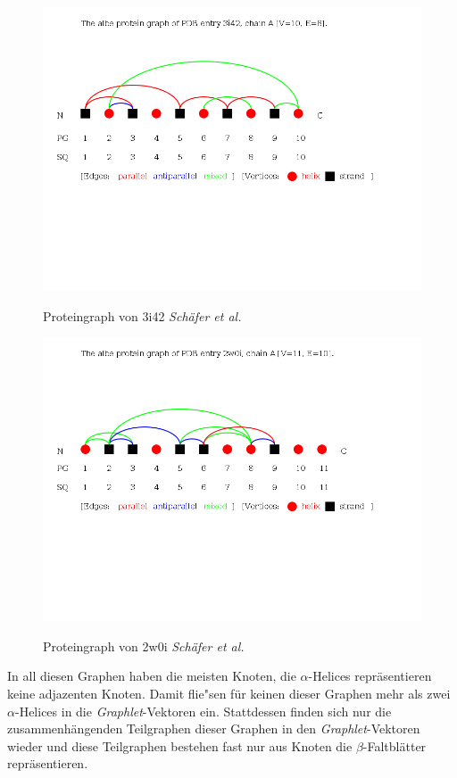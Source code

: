 \documentclass{report}
\begin{document}
\begin{figure}
\includegraphics[scale=0.5]{3i42_A_albe_PG.png}
\label{fig:3i42}
\caption{Proteingraph von 3i42 \textit{Sch\"afer et al.}}
\end{figure}

\begin{figure}
\includegraphics[scale=0.5]{2w0i_A_albe_PG.png}
\label{fig:2w0i}
\caption{Proteingraph von 2w0i \textit{Sch\"afer et al.}}
\end{figure}

In all diesen Graphen haben die meisten Knoten, die $\alpha$-Helices repr\"asentieren keine adjazenten Knoten.
Damit flie"sen f\"ur keinen dieser Graphen mehr als zwei $\alpha$-Helices in die \textit{Graphlet}-Vektoren ein. Stattdessen finden sich nur die zusammenh\"angenden Teilgraphen dieser Graphen in den \textit{Graphlet}-Vektoren wieder und diese Teilgraphen bestehen fast nur aus Knoten die $\beta$-Faltbl\"atter repr\"asentieren.
\end{document}
